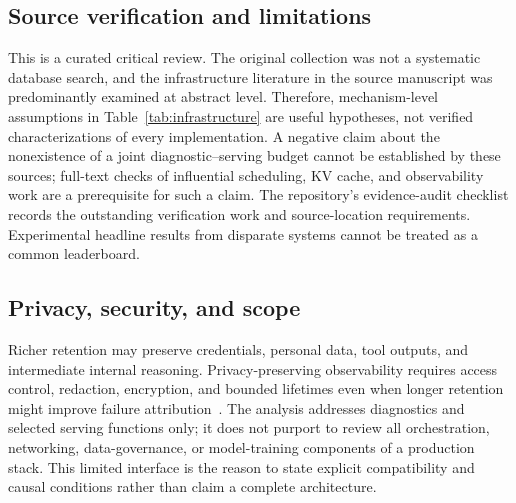 

\subsection{Source verification and limitations}
This is a curated critical review. The original collection was not a systematic database search, and the infrastructure literature in the source manuscript was predominantly examined at abstract level. Therefore, mechanism-level assumptions in Table~\ref{tab:infrastructure} are useful hypotheses, not verified characterizations of every implementation. A negative claim about the nonexistence of a joint diagnostic--serving budget cannot be established by these sources; full-text checks of influential scheduling, KV cache, and observability work are a prerequisite for such a claim. The repository's evidence-audit checklist records the outstanding verification work and source-location requirements. Experimental headline results from disparate systems cannot be treated as a common leaderboard.

\subsection{Privacy, security, and scope}
Richer retention may preserve credentials, personal data, tool outputs, and intermediate internal reasoning. Privacy-preserving observability requires access control, redaction, encryption, and bounded lifetimes even when longer retention might improve failure attribution~\cite{auditableagents2026,opentelemetry2026}. The analysis addresses diagnostics and selected serving functions only; it does not purport to review all orchestration, networking, data-governance, or model-training components of a production stack. This limited interface is the reason to state explicit compatibility and causal conditions rather than claim a complete architecture.